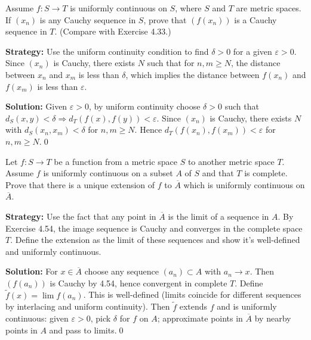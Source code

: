 \begin{problembox}
\begin{problemstatement}
Assume $f : S \to T$ is uniformly continuous on $S$, where $S$ and $T$ are metric spaces. If $(x_n)$ is any Cauchy sequence in $S$, prove that $(f(x_n))$ is a Cauchy sequence in $T$. (Compare with Exercise 4.33.)
\end{problemstatement}
\end{problembox}

\noindent\textbf{Strategy:} Use the uniform continuity condition to find $\delta > 0$ for a given $\varepsilon > 0$. Since $(x_n)$ is Cauchy, there exists $N$ such that for $n, m \geq N$, the distance between $x_n$ and $x_m$ is less than $\delta$, which implies the distance between $f(x_n)$ and $f(x_m)$ is less than $\varepsilon$.

\bigskip\noindent\textbf{Solution:}
Given $\varepsilon>0$, by uniform continuity choose $\delta>0$ such that $d_S(x,y)<\delta\Rightarrow d_T(f(x),f(y))<\varepsilon$. Since $(x_n)$ is Cauchy, there exists $N$ with $d_S(x_n,x_m)<\delta$ for $n,m\ge N$. Hence $d_T(f(x_n),f(x_m))<\varepsilon$ for $n,m\ge N$.\qed



\begin{problembox}
\begin{problemstatement}
Let $f : S \to T$ be a function from a metric space $S$ to another metric space $T$. Assume $f$ is uniformly continuous on a subset $A$ of $S$ and that $T$ is complete. Prove that there is a unique extension of $f$ to $\overline{A}$ which is uniformly continuous on $\overline{A}$.
\end{problemstatement}
\end{problembox}

\noindent\textbf{Strategy:} Use the fact that any point in $\overline{A}$ is the limit of a sequence in $A$. By Exercise 4.54, the image sequence is Cauchy and converges in the complete space $T$. Define the extension as the limit of these sequences and show it's well-defined and uniformly continuous.

\bigskip\noindent\textbf{Solution:}
For $x\in\overline{A}$ choose any sequence $(a_n)\subset A$ with $a_n\to x$. Then $(f(a_n))$ is Cauchy by 4.54, hence convergent in complete $T$. Define $\tilde f(x)=\lim f(a_n)$. This is well-defined (limits coincide for different sequences by interlacing and uniform continuity). Then $\tilde f$ extends $f$ and is uniformly continuous: given $\varepsilon>0$, pick $\delta$ for $f$ on $A$; approximate points in $\overline{A}$ by nearby points in $A$ and pass to limits.\qed



